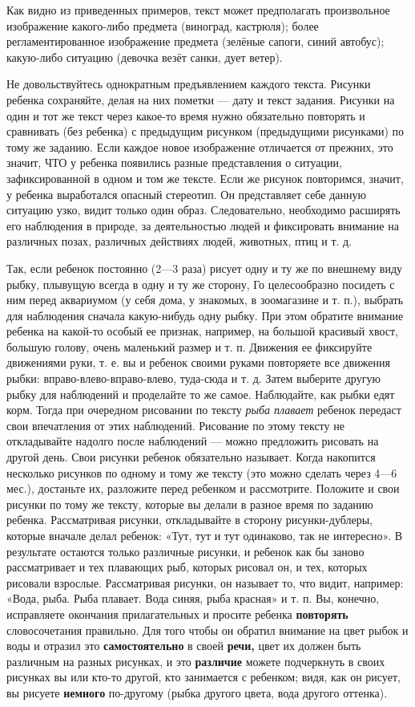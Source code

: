 \documentclass{book}
\renewcommand{\emph}[1]{\textit{#1}}
\begin{document}
Как видно из приведенных примеров, текст может предполагать произвольное
изображение какого-либо предмета (виноград, кастрюля); более
регламентированное изображение предмета (зелёные сапоги, синий автобус);
какую-либо ситуацию (девочка везёт санки, дует ветер).

Не довольствуйтесь однократным предъявлением каждого текста. Рисунки
ребенка сохраняйте, делая на них пометки --- дату и текст задания.
Рисунки на один и тот же текст через какое-то время нужно обязательно
повторять и сравнивать (без ребенка) с предыдущим рисунком (предыдущими
рисунками) по тому же заданию. Если каждое новое изображение отличается
от прежних, это значит, ЧТО у ребенка появились разные представления о
ситуации, зафиксированной в одном и том же тексте. Если же рисунок
повторимся, значит, у ребенка выработался опасный стереотип. Он
представляет себе данную ситуацию узко, видит только один образ.
Следовательно, необходимо расширять его наблюдения в природе, за
деятельностью людей и фиксировать внимание на различных позах, различных
действиях людей, животных, птиц и т. д.

Так, если ребенок постоянно (2---3 раза) рисует одну и ту же по внешнему
виду рыбку, плывущую всегда в одну и ту же сторону, Го целесообразно
посидеть с ним перед аквариумом (у себя дома, у знакомых, в зоомагазине
и т. п.), выбрать для наблюдения сначала какую-нибудь одну рыбку. При
этом обратите внимание ребенка на какой-то особый ее признак, например,
на большой красивый хвост, большую голову, очень маленький размер и т.
п. Движения ее фиксируйте движениями руки, т. е. вы и ребенок своими
руками повторяете все движения рыбки: вправо-влево-вправо-влево,
туда-сюда и т. д. Затем выберите другую рыбку для наблюдений и
проделайте то же самое. Наблюдайте, как рыбки едят корм. Тогда при
очередном рисовании по тексту \emph{рыба плавает} ребенок передаст свои
впечатления от этих наблюдений. Рисование по этому тексту не
откладывайте надолго после наблюдений --- можно предложить рисовать на
другой день. Свои рисунки ребенок обязательно называет. Когда накопится
несколько рисунков по одному и тому же тексту (это можно сделать через
4---6 мес.), достаньте их, разложите перед ребенком и рассмотрите.
Положите и свои рисунки по тому же тексту, которые вы делали в разное
время по заданию ребенка. Рассматривая рисунки, откладывайте в сторону
рисунки-дублеры, которые вначале делал ребенок: «Тут, тут и тут
одинаково, так не интересно». В результате остаются только различные
рисунки, и ребенок как бы заново рассматривает и тех плавающих рыб,
которых рисовал он, и тех, которых рисовали взрослые. Рассматривая
рисунки, он называет то, что видит, например: «Вода, рыба. Рыба плавает.
Вода синяя, рыба красная» и т. п. Вы, конечно, исправляете окончания
прилагательных и просите ребенка \textbf{повторять} словосочетания
правильно. Для того чтобы он обратил внимание на цвет рыбок и воды и
отразил это \textbf{самостоятельно} в своей \textbf{речи,} цвет их
должен быть различным на разных рисунках, и это \textbf{различие} можете
подчеркнуть в своих рисунках вы или кто-то другой, кто занимается с
ребенком; видя, как он рисует, вы рисуете \textbf{немного} по-другому
(рыбка другого цвета, вода другого оттенка).
\end{document}
